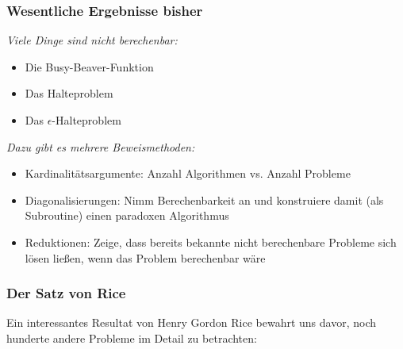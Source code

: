 \documentclass[aspectratio=1610,onlymath]{beamer}
\begin{document}
\maketitle

\begin{frame}\frametitle{Wesentliche Ergebnisse bisher}

\emph{Viele Dinge sind nicht berechenbar:}
\begin{itemize}
\item Die Busy-Beaver-Funktion
\item Das Halteproblem
\item Das $\epsilon$-Halteproblem
\end{itemize}
\bigskip

\emph{Dazu gibt es mehrere Beweismethoden:}
\begin{itemize}
\item \alert{Kardinalitätsargumente:} Anzahl Algorithmen vs. Anzahl Probleme
\item \alert{Diagonalisierungen:} Nimm Berechenbarkeit an und konstruiere damit (als Subroutine) einen paradoxen Algorithmus
\item \alert{Reduktionen:} Zeige, dass bereits bekannte nicht berechenbare Probleme sich lösen ließen, wenn das Problem berechenbar wäre
\end{itemize}

\end{frame}


\begin{frame}\frametitle{Der Satz von Rice}

Ein interessantes Resultat von Henry Gordon Rice bewahrt uns davor, noch hunderte andere Probleme im Detail zu betrachten:\medskip

\bigskip\pause



\end{frame}
\end{document}
